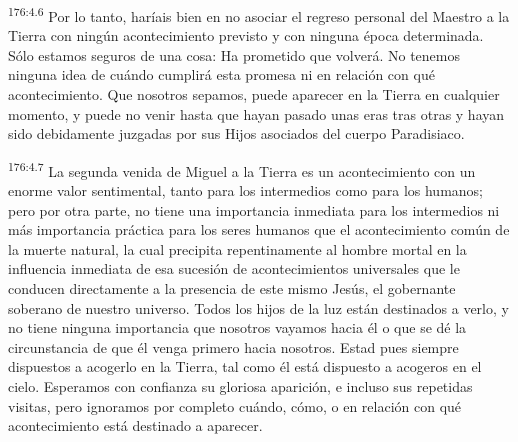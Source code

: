 \par 
\textsuperscript{176:4.6} Por lo tanto, haríais bien en no asociar el regreso personal del Maestro a la Tierra con ningún acontecimiento previsto y con ninguna época determinada. Sólo estamos seguros de una cosa: Ha prometido que volverá. No tenemos ninguna idea de cuándo cumplirá esta promesa ni en relación con qué acontecimiento. Que nosotros sepamos, puede aparecer en la Tierra en cualquier momento, y puede no venir hasta que hayan pasado unas eras tras otras y hayan sido debidamente juzgadas por sus Hijos asociados del cuerpo Paradisiaco.

\par 
\textsuperscript{176:4.7} La segunda venida de Miguel a la Tierra es un acontecimiento con un enorme valor sentimental, tanto para los intermedios como para los humanos; pero por otra parte, no tiene una importancia inmediata para los intermedios ni más importancia práctica para los seres humanos que el acontecimiento común de la muerte natural, la cual precipita repentinamente al hombre mortal en la influencia inmediata de esa sucesión de acontecimientos universales que le conducen directamente a la presencia de este mismo Jesús, el gobernante soberano de nuestro universo. Todos los hijos de la luz están destinados a verlo, y no tiene ninguna importancia que nosotros vayamos hacia él o que se dé la circunstancia de que él venga primero hacia nosotros. Estad pues siempre dispuestos a acogerlo en la Tierra, tal como él está dispuesto a acogeros en el cielo. Esperamos con confianza su gloriosa aparición, e incluso sus repetidas visitas, pero ignoramos por completo cuándo, cómo, o en relación con qué acontecimiento está destinado a aparecer.